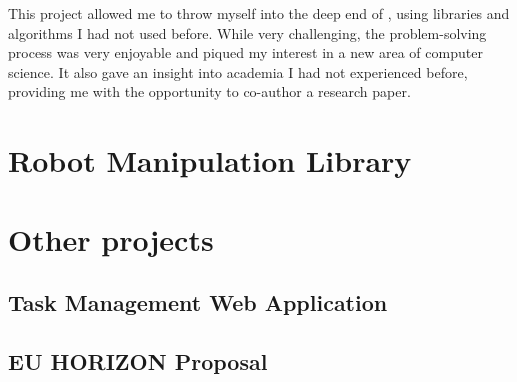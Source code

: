 This project allowed me to throw myself into the deep end of , using libraries and
algorithms I had not used before. While very challenging, the problem-solving process was very
enjoyable and piqued my interest in a new area of computer science. It also gave an insight into
academia I had not experienced before, providing me with the opportunity to co-author a research
paper.

\section{Robot Manipulation Library}

\section{Other projects}

\subsection{Task Management Web Application}

\subsection{EU HORIZON Proposal}

